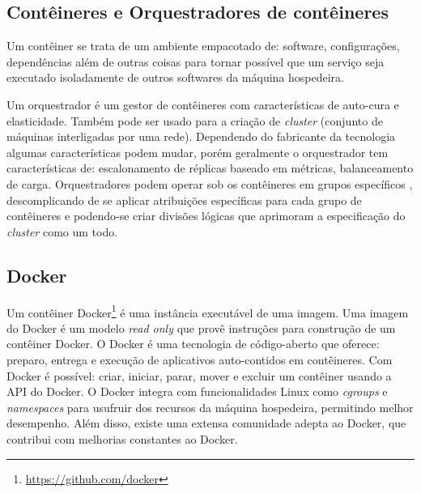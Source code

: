 

\subsection{Contêineres e Orquestradores de contêineres}


Um contêiner se trata de um ambiente empacotado de: software, configurações, dependências além de outras coisas para tornar possível que um serviço seja executado isoladamente de outros softwares da máquina hospedeira.

Um orquestrador é um gestor de contêineres com características de auto-cura e elasticidade. Também pode ser usado para a criação de \textit{cluster} (conjunto de máquinas interligadas por uma rede). Dependendo do fabricante da tecnologia algumas características podem mudar, porém geralmente o orquestrador tem características de: escalonamento de réplicas baseado em métricas, balanceamento de carga. Orquestradores podem operar sob os contêineres em grupos específicos \cite{casalicchio2019container}, descomplicando de se aplicar atribuições específicas para cada grupo de contêineres e podendo-se criar divisões lógicas que aprimoram a especificação do \textit{cluster} como um todo.


\subsection{Docker}

Um contêiner Docker\footnote{\url{https://github.com/docker}} \cite{docker/docs/2022} é uma instância executável de uma imagem. Uma imagem do Docker é um modelo \textit{read only} que provê instruções para construção de um contêiner Docker. O Docker é uma tecnologia de código-aberto que oferece: preparo, entrega e execução de aplicativos auto-contidos em contêineres. Com Docker é possível: criar, iniciar, parar, mover e excluir um contêiner usando a \gls{API} do Docker. O Docker integra com funcionalidades Linux como \textit{cgroups} e \textit{namespaces} para usufruir dos recursos da máquina hospedeira, permitindo melhor desempenho. Além disso, existe uma extensa comunidade adepta ao Docker, que contribui com melhorias constantes ao Docker. 

